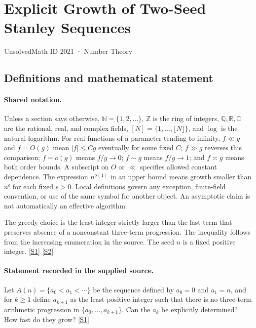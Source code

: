 \documentclass[11pt,a4paper]{article}
\newcommand{\N}{\mathbb{N}}
\newcommand{\Z}{\mathbb{Z}}
\newcommand{\Q}{\mathbb{Q}}
\newcommand{\R}{\mathbb{R}}
\newcommand{\C}{\mathbb{C}}
\newcommand{\sref}[2]{\hyperlink{source:#1:#2}{[S#2]}}
\begin{document}

\setcounter{section}{2020}

\section{Explicit Growth of Two-Seed Stanley Sequences}\label{2021}

{\small\sffamily UnsolvedMath ID 2021 · Number Theory}

\subsection{Definitions and mathematical statement}

\paragraph{Shared notation.}Unless a section says otherwise, $\N=\{1,2,\ldots\}$,
$\Z$ is the ring of integers, $\Q,\R,\C$ are the rational, real, and complex
fields, $[N]=\{1,\ldots,\lfloor N\rfloor\}$, and $\log$ is the natural
logarithm. For real functions of a parameter tending to infinity,
$f\ll g$ and $f=O(g)$ mean $|f|\leq Cg$ eventually for some fixed $C$;
$f\gg g$ reverses this comparison; $f=o(g)$ means $f/g\to0$;
$f\sim g$ means $f/g\to1$; and $f\asymp g$ means both order bounds.
A subscript on $O$ or $\ll$ specifies allowed constant dependence.
The expression $n^{o(1)}$ in an upper bound means growth smaller than
$n^\epsilon$ for each fixed $\epsilon>0$. Local definitions govern any
exception, finite-field convention, or use of the same symbol for another
object. An asymptotic claim is not automatically an effective algorithm.



The greedy choice is the least integer strictly larger than the last term that preserves absence of a nonconstant three-term progression. The inequality follows from the increasing enumeration in the source. The seed $n$ is a fixed positive integer. \sref{2021}{1} \sref{2021}{2}

\paragraph{Statement recorded in the supplied source.}
Let $A(n)=\{a_0<a_1<\cdots\}$ be the sequence defined by $a_0=0$ and $a_1=n$, and for $k\geq 1$ define $a_{k+1}$ as the least positive integer such that there is no three-term arithmetic progression in $\{a_0,\ldots,a_{k+1}\}$.
Can the $a_k$ be explicitly determined? How fast do they grow? \sref{2021}{1}
\end{document}
